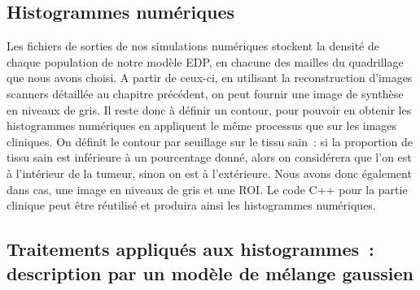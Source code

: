 \documentclass[main.tex]{subfiles}
\begin{document}
\subsection{Histogrammes numériques}
Les fichiers de sorties de nos simulations numériques stockent la densité de chaque population de notre modèle EDP, en chacune des mailles du quadrillage que nous avons choisi. 
A partir de ceux-ci, en utilisant la reconstruction d'images scanners détaillée au chapitre précédent, on peut fournir une image de synthèse en niveaux de gris. 
Il reste donc à définir un contour, pour pouvoir en obtenir les histogrammes numériques en appliquent le même processus que sur les images cliniques. 
On définit le contour par seuillage sur le tissu sain~: 
si la proportion de tissu sain est inférieure à un pourcentage donné, alors on considérera que l'on est à l'intérieur de la tumeur, sinon on est à l'extérieure. Nous avons donc également dans cas, une image en niveaux de gris et une ROI. Le code C++ pour la partie clinique peut être réutilisé et produira ainsi les histogrammes numériques.

\subsection{Traitements appliqués aux histogrammes~: description par un modèle de mélange  gaussien}
\end{document}
